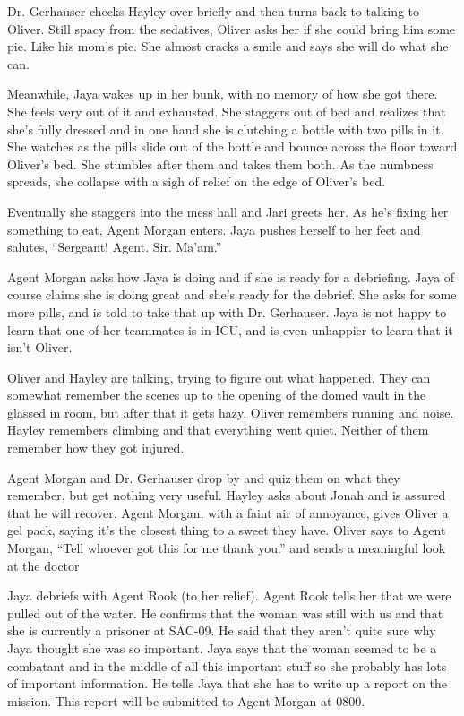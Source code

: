 Dr. Gerhauser checks Hayley over briefly and then turns back to talking to Oliver.  Still spacy from the sedatives, Oliver asks her if she could bring him some pie.  Like his mom's pie.  She almost cracks a smile and says she will do what she can.



Meanwhile, Jaya wakes up in her bunk, with no memory of how she got there.  She feels very out of it and exhausted.  She staggers out of bed and realizes that she's fully dressed and in one hand she is clutching a bottle with two pills in it. She watches as the pills slide out of the bottle and bounce across the floor toward Oliver's bed.  She stumbles after them and takes them both.  As the numbness spreads, she collapse with a sigh of relief on the edge of Oliver's bed.



Eventually she staggers into the mess hall and Jari greets her.  As he's fixing her something to eat, Agent Morgan enters.  Jaya pushes herself to her feet and salutes, ``Sergeant!  Agent.  Sir.  Ma'am.''



Agent Morgan asks how Jaya is doing and if she is ready for a debriefing.  Jaya of course claims she is doing great and she's ready for the debrief.  She asks for some more pills, and is told to take that up with Dr. Gerhauser.  Jaya is not happy to learn that one of her teammates is in ICU, and is even unhappier to learn that it isn't Oliver.  



Oliver and Hayley are talking, trying to figure out what happened.  They can somewhat remember the scenes up to the opening of the domed vault in the glassed in room, but after that it gets hazy.  Oliver remembers running and noise.  Hayley remembers climbing and that everything went quiet.  Neither of them remember how they got injured.



Agent Morgan and Dr. Gerhauser drop by and quiz them on what they remember, but get nothing very useful.  Hayley asks about Jonah and is assured that he will recover.  Agent Morgan, with a faint air of annoyance, gives Oliver a gel pack, saying it's the closest thing to a sweet they have.  Oliver says to Agent Morgan, ``Tell whoever got this for me thank you.''  and sends a meaningful look at the doctor



Jaya debriefs with Agent Rook (to her relief). Agent Rook tells her that we were pulled out of the water. He confirms that the woman was still with us and that she is currently a prisoner at SAC-09.  He said that they aren't quite sure why Jaya thought she was so important. Jaya says that the woman seemed to be a combatant and in the middle of all this important stuff so she probably has lots of important information.  He tells Jaya that she has to write up a report on the mission.  This report will be submitted to Agent Morgan at 0800.  



